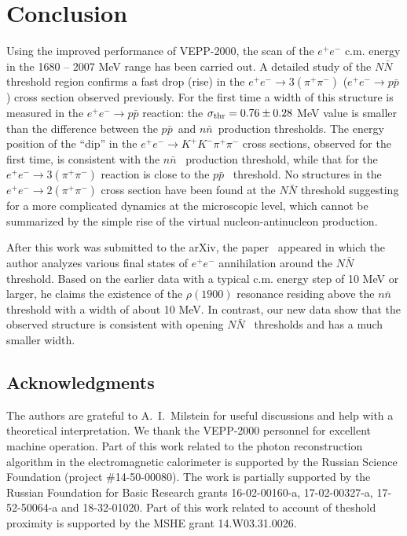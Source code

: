 \documentclass[12pt]{elsarticle}
\def\epem {\ensuremath{e^+ e^-}}
\def\ppbar {\ensuremath{p\bar p}}
\def\nnbar {\ensuremath{n\bar n}}
\def\NNbar {\ensuremath{N\bar N}}
\begin{document}
\section*{ \boldmath Conclusion}
\hspace*{\parindent}
Using the improved performance of VEPP-2000, the scan of the $\epem$ c.m. 
energy in the 1680 -- 2007 MeV range has been carried out. A detailed study of
the $\NNbar$ threshold region confirms a fast drop (rise) in the  
$e^+e^-\to 3(\pi^+\pi^-)$ ($\epem\to\ppbar$) cross section observed 
previously. For the first time a width of this structure is measured 
in the $\epem\to\ppbar$ reaction: 
the $\sigma_{\rm thr} = 0.76\pm0.28$ MeV value is smaller than the 
difference between the \ppbar~and \nnbar~production thresholds.
The energy position of the ``dip'' in the $e^+e^-\to K^+K^-\pi^+\pi^-$ 
cross sections,  observed for the first time, is consistent with 
the \nnbar~ production threshold, while that for the $e^+e^-\to 3(\pi^+\pi^-)$ 
reaction is close to the \ppbar~ threshold.
No structures in the $\epem\to 2(\pi^+\pi^-)$ cross section have been 
found at the $\NNbar$ threshold suggesting
 for a more complicated dynamics at the microscopic level, which cannot be summarized by the simple rise of the virtual nucleon-antinucleon production.

After this work was submitted to the arXiv, the paper~\cite{lichard}
appeared in which the author analyzes various final states of 
$e^+e^-$ annihilation around the \NNbar~ threshold. Based on the earlier data
with a typical c.m. energy step of 10 MeV or larger, he claims the existence 
of the $\rho(1900)$ resonance residing above the \nnbar~ threshold with a
width of about 10 MeV. In contrast, our new data show that the observed 
structure is consistent with opening \NNbar~ thresholds and has a
much smaller width.  
    
%
\subsection*{Acknowledgments}
\hspace*{\parindent}
The authors are grateful to A.~I.~Milstein for useful discussions and
help with a theoretical interpretation. 
We thank the VEPP-2000 personnel for excellent machine operation. Part of 
this work related to the photon reconstruction algorithm in the 
electromagnetic calorimeter is supported by the Russian Science Foundation 
(project \#14-50-00080). The work is partially supported by the Russian 
Foundation for Basic Research grants 16-02-00160-a,
17-02-00327-a, 17-52-50064-a and 18-32-01020. Part of this work related
to account of theshold proximity is supported by the MSHE grant   
14.W03.31.0026.
%
%

\end{document}

